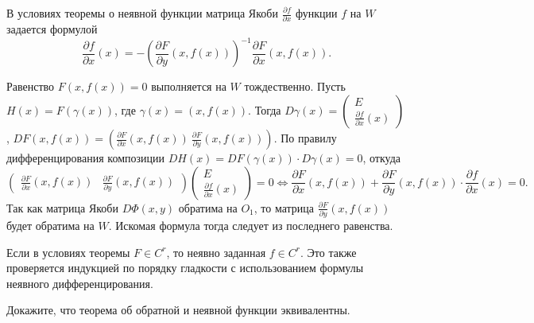 \begin{corollary}
	В условиях теоремы о неявной функции матрица Якоби $\frac{\partial f}{\partial x}$ функции $f$ на $W$ задается формулой 
	\[ \frac{\partial f}{\partial x} (x) = - \left( \frac{\partial F}{\partial y} (x, f(x)) \right)^{-1} \frac{\partial F}{\partial x} (x, f(x)). \]
\end{corollary}

\begin{myproof}
	Равенство $F(x, f(x)) = 0$ выполняется на $W$ тождественно.
	Пусть $H(x) = F(\gamma(x))$, где $\gamma(x) = (x, f(x))$.
	Тогда $D \gamma(x) = \begin{pmatrix}
		E \\ 
		\frac{\partial f}{\partial x}(x)
	\end{pmatrix}$, $DF (x, f(x)) = \left( \frac{\partial F}{\partial x}(x, f(x)) \ \frac{\partial F}{\partial y}(x, f(x)) \right)$.
	По правилу дифференцирования композиции $DH(x) = DF(\gamma(x)) \cdot D\gamma(x) = 0$, откуда
	\[ \begin{pmatrix}
		\frac{\partial F}{\partial x}(x, f(x)) & \frac{\partial F}{\partial y}(x, f(x))
	\end{pmatrix} 
	\begin{pmatrix}
		E \\ 
		\frac{\partial f}{\partial x}(x)
	\end{pmatrix} = 0 \iff \frac{\partial F}{\partial x}(x, f(x)) + \frac{\partial F}{\partial y}(x, f(x)) \cdot \frac{\partial f}{\partial x}(x) = 0. \]
	Так как матрица Якоби $D \Phi(x, y)$ обратима на $O_1$, то матрица $\frac{\partial F}{\partial y}(x, f(x))$ будет обратима на $W$. 
	Искомая формула тогда следует из последнего равенства.
\end{myproof}

\begin{note}
	Если в условиях теоремы $F \in C^r$, то неявно заданная $f \in C^r$. 
	Это также проверяется индукцией по порядку гладкости с использованием формулы неявного дифференцирования.
\end{note}

\begin{problem}
	Докажите, что теорема об обратной и неявной функции эквивалентны.
\end{problem}
